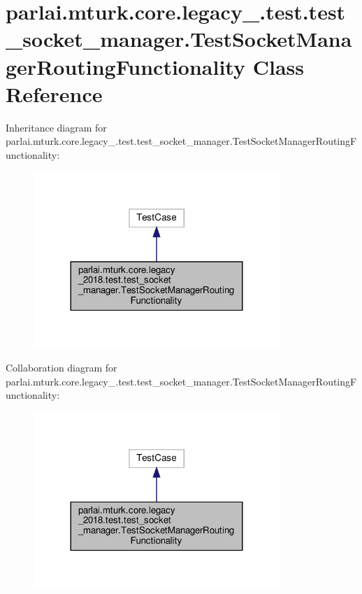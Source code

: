 \hypertarget{classparlai_1_1mturk_1_1core_1_1legacy__2018_1_1test_1_1test__socket__manager_1_1TestSocketManagerRoutingFunctionality}{}\section{parlai.\+mturk.\+core.\+legacy\+\_.\+test.\+test\+\_\+socket\+\_\+manager.\+Test\+Socket\+Manager\+Routing\+Functionality Class Reference}
\label{classparlai_1_1mturk_1_1core_1_1legacy__2018_1_1test_1_1test__socket__manager_1_1TestSocketManagerRoutingFunctionality}


Inheritance diagram for parlai.\+mturk.\+core.\+legacy\+\_.\+test.\+test\+\_\+socket\+\_\+manager.\+Test\+Socket\+Manager\+Routing\+Functionality\+:
\nopagebreak
\begin{figure}[H]
\begin{center}
\leavevmode
\includegraphics[width=264pt]{classparlai_1_1mturk_1_1core_1_1legacy__2018_1_1test_1_1test__socket__manager_1_1TestSocketManag86b85ab3da5b3f6830a9f736498e595a}
\end{center}
\end{figure}


Collaboration diagram for parlai.\+mturk.\+core.\+legacy\+\_.\+test.\+test\+\_\+socket\+\_\+manager.\+Test\+Socket\+Manager\+Routing\+Functionality\+:
\nopagebreak
\begin{figure}[H]
\begin{center}
\leavevmode
\includegraphics[width=264pt]{classparlai_1_1mturk_1_1core_1_1legacy__2018_1_1test_1_1test__socket__manager_1_1TestSocketManag3135cdcbf4129eb3031822e48e2e6e3c}
\end{center}
\end{figure}
